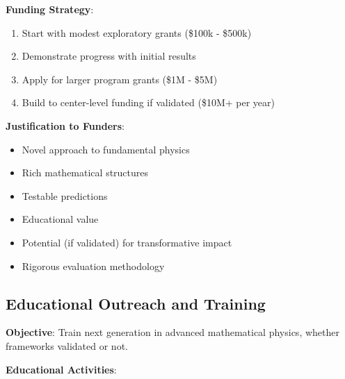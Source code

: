\textbf{Funding Strategy}:
\begin{enumerate}
    \item Start with modest exploratory grants (\$100k - \$500k)
    \item Demonstrate progress with initial results
    \item Apply for larger program grants (\$1M - \$5M)
    \item Build to center-level funding if validated (\$10M+ per year)
\end{enumerate}

\textbf{Justification to Funders}:
\begin{itemize}
    \item Novel approach to fundamental physics
    \item Rich mathematical structures
    \item Testable predictions
    \item Educational value
    \item Potential (if validated) for transformative impact
    \item Rigorous evaluation methodology
\end{itemize}

\subsection{Educational Outreach and Training}

\textbf{Objective}: Train next generation in advanced mathematical physics, whether frameworks validated or not.

\textbf{Educational Activities}:

